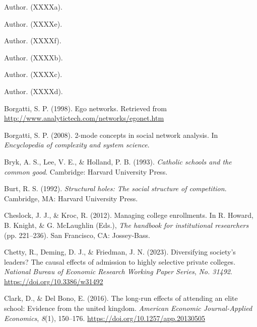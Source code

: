 \documentclass[
  12pt,
]{article}
\newlength{\cslhangindent}
\newlength{\cslentryspacingunit} %
\newenvironment{CSLReferences}[2] %
 {%
  \setlength{\parindent}{0pt}
  \ifodd #1
  \let\oldpar\par
  \def\par{\hangindent=\cslhangindent\oldpar}
  \fi
  \setlength{\parskip}{#2\cslentryspacingunit}
 }%
 {}
\begin{document}
\hypertarget{refs}{}
\begin{CSLReferences}{1}{0}
\leavevmode{}%
Author. (XXXXa).

\leavevmode{}%
Author. (XXXXe).

\leavevmode{}%
Author. (XXXXf).

\leavevmode{}%
Author. (XXXXb).

\leavevmode{}%
Author. (XXXXc).

\leavevmode{}%
Author. (XXXXd).

\leavevmode{}%
Borgatti, S. P. (1998). Ego networks. Retrieved from \url{http://www.analytictech.com/networks/egonet.htm}

\leavevmode{}%
Borgatti, S. P. (2008). 2-mode concepts in social network analysis. In \emph{Encyclopedia of complexity and system science}.

\leavevmode{}%
Bryk, A. S., Lee, V. E., \& Holland, P. B. (1993). \emph{Catholic schools and the common good}. Cambridge: Harvard University Press.

\leavevmode{}%
Burt, R. S. (1992). \emph{Structural holes: The social structure of competition}. Cambridge, MA: Harvard University Press.

\leavevmode{}%
Cheslock, J. J., \& Kroc, R. (2012). Managing college enrollments. In R. Howard, B. Knight, \& G. McLaughlin (Eds.), \emph{The handbook for institutional researchers} (pp. 221--236). San Francisco, CA: Jossey-Bass.

\leavevmode{}%
Chetty, R., Deming, D. J., \& Friedman, J. N. (2023). Diversifying society's leaders? The causal effects of admission to highly selective private colleges. \emph{National Bureau of Economic Research Working Paper Series}, \emph{No. 31492}. \url{https://doi.org/10.3386/w31492}

\leavevmode{}%
Clark, D., \& Del Bono, E. (2016). The long-run effects of attending an elite school: Evidence from the united kingdom. \emph{American Economic Journal-Applied Economics}, \emph{8}(1), 150--176. \url{https://doi.org/10.1257/app.20130505}


\end{CSLReferences}
\end{document}
